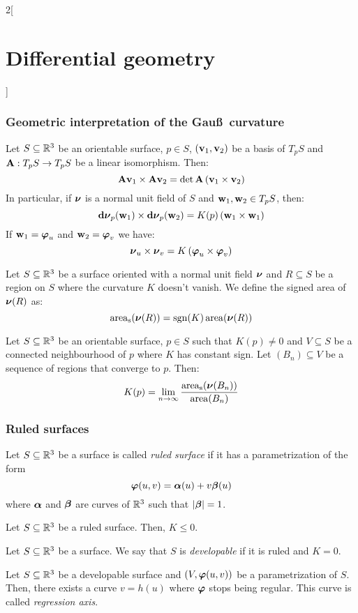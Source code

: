 \documentclass[../../../main_math.tex]{subfiles}
\begin{document}
\begin{multicols}{2}[\section{Differential geometry}]
  \subsubsection{Geometric interpretation of the Gau\ss\ curvature}
  \begin{lemma}
    Let $S\subseteq\mathbb{R}^3$ be an orientable surface, $p\in S$, $(\boldsymbol{\mathrm{v}}_1,\boldsymbol{\mathrm{v}}_2)$ be a basis of $T_pS$ and $\boldsymbol{\mathrm{A}}:T_pS\rightarrow T_pS$ be a linear isomorphism. Then: $$\boldsymbol{\mathrm{A}}\boldsymbol{\mathrm{v}}_1\times\boldsymbol{\mathrm{A}}\boldsymbol{\mathrm{v}}_2=\det\boldsymbol{\mathrm{A}}\left(\boldsymbol{\mathrm{v}}_1\times\boldsymbol{\mathrm{v}}_2\right)$$
    In particular, if $\boldsymbol{\mathrm{\nu}}$ is a normal unit field of $S$ and $\boldsymbol{\mathrm{w}}_1,\boldsymbol{\mathrm{w}}_2\in T_pS$, then: $$\boldsymbol{\mathrm{\dd{\nu}}}_p(\boldsymbol{\mathrm{w}}_1)\times\boldsymbol{\mathrm{\dd{\nu}}}_p(\boldsymbol{\mathrm{w}}_2)=K(p)\left(\boldsymbol{\mathrm{w}}_1\times\boldsymbol{\mathrm{w}}_1\right)$$
    If $\boldsymbol{\mathrm{w}}_1=\boldsymbol{\mathrm{\varphi}}_u$ and $\boldsymbol{\mathrm{w}}_2=\boldsymbol{\mathrm{\varphi}}_v$ we have: $$\boldsymbol{\mathrm{\nu}}_u\times\boldsymbol{\mathrm{\nu}}_v=K\left(\boldsymbol{\mathrm{\varphi}}_u\times\boldsymbol{\mathrm{\varphi}}_v\right)$$
  \end{lemma}
  \begin{definition}
    Let $S\subseteq\mathbb{R}^3$ be a surface oriented with a normal unit field $\boldsymbol{\mathrm{\nu}}$ and $R\subseteq S$ be a region on $S$ where the curvature $K$ doesn't vanish. We define the signed area of $\boldsymbol{\mathrm{\nu}}(R)$ as: $$\operatorname{area}_\text{s}(\boldsymbol{\mathrm{\nu}}(R))=\operatorname{sgn}(K)\operatorname{area}(\boldsymbol{\mathrm{\nu}}(R))$$
  \end{definition}
  \begin{proposition}
    Let $S\subseteq\mathbb{R}^3$ be an orientable surface, $p\in S$ such that $K(p)\ne 0$ and $V\subseteq S$ be a connected neighbourhood of $p$ where $K$ has constant sign. Let $(B_n)\subseteq V$ be a sequence of regions that converge to $p$. Then: $$K(p)=\lim_{n\to\infty}\frac{\operatorname{area}_\text{s}(\boldsymbol{\mathrm{\nu}}(B_n))}{\operatorname{area}(B_n)}$$
  \end{proposition}
  \subsubsection{Ruled surfaces}
  \begin{definition}
    Let $S\subseteq\mathbb{R}^3$ be a surface is called \emph{ruled surface} if it has a parametrization of the form $$\boldsymbol{\mathrm{\varphi}}(u,v)=\boldsymbol{\mathrm{\alpha}}(u)+v\boldsymbol{\mathrm{\beta}}(u)$$ where $\boldsymbol{\mathrm{\alpha}}$ and $\boldsymbol{\mathrm{\beta}}$ are curves of $\mathbb{R}^3$ such that $\abs{\boldsymbol{\mathrm{\beta}}}=1$.
  \end{definition}
  \begin{proposition}
    Let $S\subseteq\mathbb{R}^3$ be a ruled surface. Then, $K\leq 0$.
  \end{proposition}
  \begin{definition}
    Let $S\subseteq\mathbb{R}^3$ be a surface. We say that $S$ is \emph{developable} if it is ruled and $K=0$.
  \end{definition}
  \begin{proposition}
    Let $S\subseteq\mathbb{R}^3$ be a developable surface and $(V,\boldsymbol{\mathrm{\varphi}}(u,v))$ be a parametrization of $S$. Then, there exists a curve $v=h(u)$ where $\boldsymbol{\mathrm{\varphi}}$ stops being regular. This curve is called \emph{regression axis}.
  \end{proposition}

\end{multicols}
\end{document}
